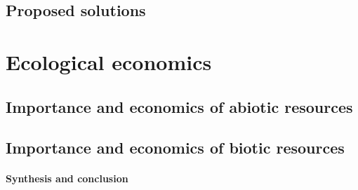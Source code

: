 
\subsection{Proposed solutions}

\section{Ecological economics}
\subsection{Importance and economics of abiotic resources}

\subsection{Importance and economics of biotic resources}

\paragraph{Synthesis and conclusion}
